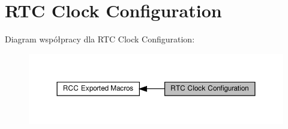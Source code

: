 \hypertarget{group___r_c_c___internal___r_t_c___clock___configuration}{}\section{R\+TC Clock Configuration}
\label{group___r_c_c___internal___r_t_c___clock___configuration}
Diagram współpracy dla R\+TC Clock Configuration\+:\nopagebreak
\begin{figure}[H]
\begin{center}
\leavevmode
\includegraphics[width=350pt]{group___r_c_c___internal___r_t_c___clock___configuration}
\end{center}
\end{figure}
